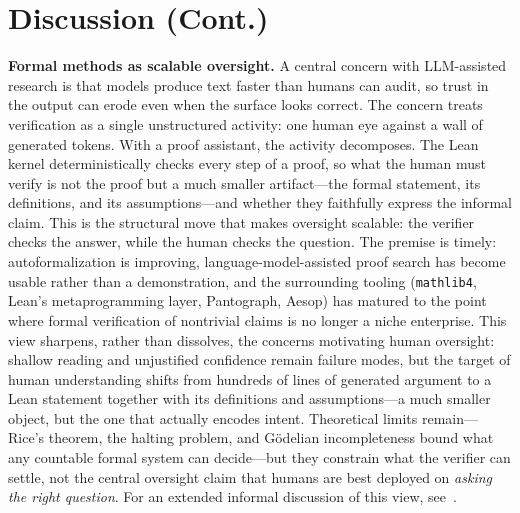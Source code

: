 \documentclass[numbers]{article}
\begin{document}
\section{Discussion (Cont.)}
\textbf{Formal methods as scalable oversight.}
A central concern with LLM-assisted research is that models produce text faster than humans can audit, so trust in the output can erode even when the surface looks correct.
The concern treats verification as a single unstructured activity: one human eye against a wall of generated tokens.
With a proof assistant, the activity decomposes.
The Lean kernel deterministically checks every step of a proof, so what the human must verify is not the proof but a much smaller artifact---the formal statement, its definitions, and its assumptions---and whether they faithfully express the informal claim.
This is the structural move that makes oversight scalable: the verifier checks the answer, while the human checks the question.
The premise is timely: autoformalization is improving, language-model-assisted proof search has become usable rather than a demonstration, and the surrounding tooling (\texttt{mathlib4}, Lean's metaprogramming layer, Pantograph, Aesop) has matured to the point where formal verification of nontrivial claims is no longer a niche enterprise.
This view sharpens, rather than dissolves, the concerns motivating human oversight: shallow reading and unjustified confidence remain failure modes, but the target of human understanding shifts from hundreds of lines of generated argument to a Lean statement together with its definitions and assumptions---a much smaller object, but the one that actually encodes intent.
Theoretical limits remain---Rice's theorem, the halting problem, and G\"odelian incompleteness bound what any countable formal system can decide---but they constrain what the verifier can settle, not the central oversight claim that humans are best deployed on \emph{asking the right question}.
For an extended informal discussion of this view, see~\citep{miranda2026formaloversight}.
\end{document}

